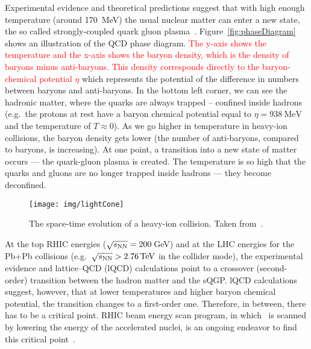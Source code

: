 Experimental evidence and theoretical predictions suggest that with high enough temperature (around \SI{170}{\mega\electronvolt}) the usual nuclear matter can enter a new state, the so called strongly-coupled quark gluon plasma~\cite{QGPdiscovered}\@. Figure~\ref{fig:phaseDiagram} shows an illustration of the QCD phase diagram. 
\textcolor{red}{
 The y-axis shows the temperature and the x-axis shows the baryon density, which is the density of baryons minus anti-baryons. This density corresponds directly to the baryon-chemical potential $\eta$ 
}
which represents the potential of the difference in numbers between baryons and anti-baryons. In the bottom left corner, we can see the hadronic matter, where the quarks are always trapped -- confined inside hadrons (e.g.\ the protons at rest have a baryon chemical potential equal to $\eta = \SI{938}{\mega\electronvolt}$ and the temperature of $T \approx 0$). 
As we go higher in temperature in heavy-ion collisions, the baryon density gets lower (the number of anti-baryons, compared to baryons, is increasing). At one point, a transition into a new state of matter occurs --- the quark-gluon plasma is created. The temperature is so high that the quarks and gluons are no longer trapped inside hadrons --- they become deconfined. 

\begin{figure}[!htb]
\centering
\texttt{[image: img/lightCone]}
\caption[The space-time evolution of a heavy-ion collision.]{The space-time evolution of a heavy-ion collision. Taken from~\cite{helen}.}
\label{fig:lightCone}
\end{figure}

At the top RHIC energies ($\sqrt{s_\text{NN}} = 200\,$GeV) and at the LHC energies for the Pb+Pb collisions (e.g.\ $\snn > \SI{2.76}{\tera\electronvolt}$ in the collider mode), the experimental evidence and lattice--QCD (lQCD) calculations point to a crossover (second-order) transition between the hadron matter and the sQGP\@. lQCD calculations suggest, however, that at lower temperatures and higher baryon chemical potential, the transition changes to a first-order one. Therefore, in between, there has to be a critical point. RHIC beam energy scan program, in which \snn\ is scanned by lowering the energy of the accelerated nuclei, is an ongoing endeavor to find this critical point~\cite{BESII}. 


